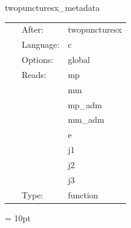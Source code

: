 \hspace{5mm} twopuncturesx\_metadata 

\hspace{5mm}{\it output twopuncturesx metadata } 


\hspace{5mm}

 \begin{tabular*}{160mm}{cll} 
~ & After:  & twopuncturesx \\ 
~ & Language:  & c \\ 
~ & Options:  & global \\ 
~ & Reads:  & mp \\ 
~& ~ &mm\\ 
~& ~ &mp\_adm\\ 
~& ~ &mm\_adm\\ 
~& ~ &e\\ 
~& ~ &j1\\ 
~& ~ &j2\\ 
~& ~ &j3\\ 
~ & Type:  & function \\ 
\end{tabular*} 



\vspace{5mm}\parskip = 10pt 
